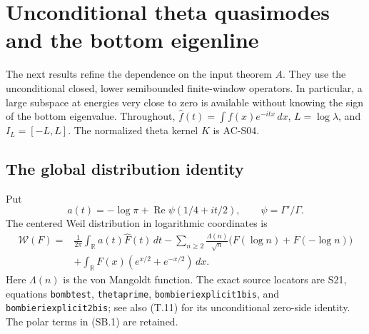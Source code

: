 \section{Unconditional theta quasimodes and the bottom eigenline}
\label{sec:ACspectralboundary}

The next results refine the dependence on the input theorem \(A\).
They use the unconditional closed, lower semibounded finite-window
operators.  In particular, a large subspace at energies very close to
zero is available without knowing the sign of the bottom eigenvalue.
Throughout, \(\widehat f(t)=\int f(x)e^{-itx}\,dx\), \(L=\log\lambda\),
and \(I_L=[-L,L]\).  The normalized theta kernel \(K\) is AC-S04.

\subsection{The global distribution identity}

Put
\[
 a(t)=-\log\pi+
       \operatorname{Re}\psi(1/4+it/2),
 \qquad \psi=\Gamma'/\Gamma .
\]
The centered Weil distribution in logarithmic coordinates is
\[
\begin{split}
 \mathcal W(F)={}&
 \frac1{2\pi}\int_{\mathbb R}a(t)\widehat F(t)\,dt
 -\sum_{n\geq2}\frac{\Lambda(n)}{\sqrt n}
                   \bigl(F(\log n)+F(-\log n)\bigr)\\
 &+\int_{\mathbb R}F(x)(e^{x/2}+e^{-x/2})\,dx .
\end{split}                                                    \tag{SB.1}
\]
Here \(\Lambda(n)\) is the von Mangoldt function.  The exact source
locators are S21, equations \texttt{bombtest},
\texttt{thetaprime}, \texttt{bombieriexplicit1bis}, and
\texttt{bombieriexplicit2bis}; see also (T.11) for its unconditional
zero-side identity.  The polar terms in (SB.1) are retained.

